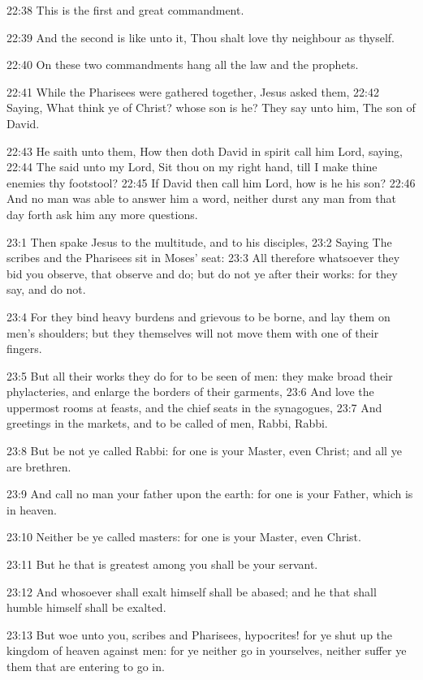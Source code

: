 22:38 This is the first and great commandment.

22:39 And the second is like unto it, Thou shalt love thy neighbour as thyself.

22:40 On these two commandments hang all the law and the prophets.

22:41 While the Pharisees were gathered together, Jesus asked them, 22:42 Saying, What think ye of Christ? whose son is he? They say unto him, The son of David.

22:43 He saith unto them, How then doth David in spirit call him Lord, saying, 22:44 The \LORD said unto my Lord, Sit thou on my right hand, till I make thine enemies thy footstool?  22:45 If David then call him Lord, how is he his son?  22:46 And no man was able to answer him a word, neither durst any man from that day forth ask him any more questions.

23:1 Then spake Jesus to the multitude, and to his disciples, 23:2 Saying The scribes and the Pharisees sit in Moses' seat: 23:3 All therefore whatsoever they bid you observe, that observe and do; but do not ye after their works: for they say, and do not.

23:4 For they bind heavy burdens and grievous to be borne, and lay them on men's shoulders; but they themselves will not move them with one of their fingers.

23:5 But all their works they do for to be seen of men: they make broad their phylacteries, and enlarge the borders of their garments, 23:6 And love the uppermost rooms at feasts, and the chief seats in the synagogues, 23:7 And greetings in the markets, and to be called of men, Rabbi, Rabbi.

23:8 But be not ye called Rabbi: for one is your Master, even Christ; and all ye are brethren.

23:9 And call no man your father upon the earth: for one is your Father, which is in heaven.

23:10 Neither be ye called masters: for one is your Master, even Christ.

23:11 But he that is greatest among you shall be your servant.

23:12 And whosoever shall exalt himself shall be abased; and he that shall humble himself shall be exalted.

23:13 But woe unto you, scribes and Pharisees, hypocrites! for ye shut up the kingdom of heaven against men: for ye neither go in yourselves, neither suffer ye them that are entering to go in.

